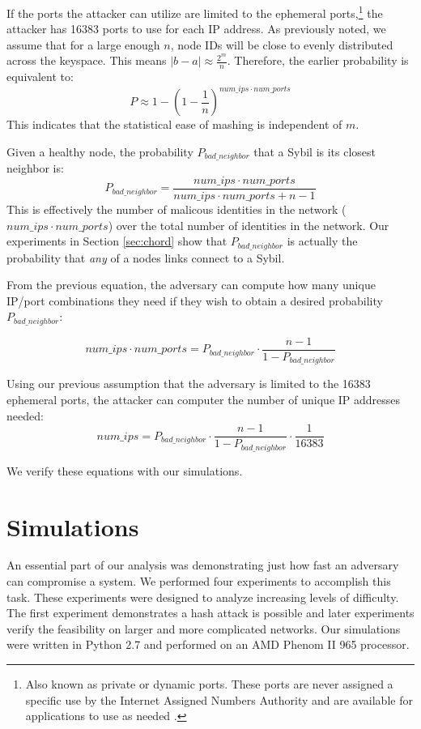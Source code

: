 If the ports the attacker can utilize are limited to the ephemeral ports,\footnote{Also known as private or dynamic ports.  These ports are never assigned a specific use by the Internet Assigned Numbers Authority  and are available for applications to use as needed \cite{cotton2011internet}.} the attacker has 16383 ports to use for each IP address.
As previously noted, we assume that for a large enough $n$, node IDs will be close to evenly distributed across the keyspace.
This means $|b-a| \approx \frac{2^{m}}{n}$.
Therefore, the earlier probability is equivalent to:
$$ P \approx  1 - (1 -\frac{1}{n})^{num\_ips \cdot num\_ports}  $$
This indicates that the statistical ease of mashing is independent of $m$.

Given a healthy node, the probability $P_{bad\_neighbor}$ that a Sybil is its closest neighbor is:
\begin{equation}
P_{bad\_neighbor} =  \frac{num\_ips \cdot num\_ports}{num\_ips \cdot num\_ports + n - 1}
\label{eq:bad}
\end{equation}
This is effectively the number of malicous identities in the network ($num\_ips \cdot num\_ports$) over the total number of identities in the network.
Our experiments in Section \ref{sec:chord} show that $P_{bad\_neighbor}$ is actually the probability that \textit{any} of a nodes links connect to a Sybil.

From the previous equation, the adversary can compute how many unique IP/port combinations they need if they wish to obtain a desired probability $P_{bad\_neighbor}$:

$$ num\_ips \cdot num\_ports = P_{bad\_neighbor} \cdot \frac{n - 1}{1 - P_{bad\_neighbor} }$$

Using our previous assumption that the adversary is limited to the 16383 ephemeral ports, the attacker can computer the number of unique IP addresses needed:
$$ num\_ips  =  P_{bad\_neighbor} \cdot \frac{n - 1}{1 - P_{bad\_neighbor} }  \cdot \frac{1}{16383}$$


We verify these equations with our simulations.

\section{Simulations}
\label{sec:sybil-sim}
An essential part of our analysis was demonstrating just how fast an adversary can compromise a system.
We performed four experiments to accomplish this task.
These experiments were designed to analyze increasing levels of difficulty.
The first experiment demonstrates a hash attack is possible and later experiments verify the feasibility on larger and more complicated networks.
Our simulations were written in Python 2.7 and performed on an AMD Phenom II 965 processor. %

